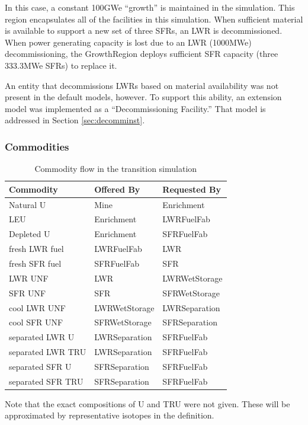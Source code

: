 In this case, a constant 100GWe ``growth'' is maintained in the simulation. 
This region encapsulates all of the facilities in this simulation. 
When sufficient material is available to support a new set of three SFRs, an 
LWR is decommissioned. When power generating capacity is lost due to an LWR 
(1000MWe) decommissioning, the GrowthRegion deploys sufficient SFR capacity 
(three 333.3MWe SFRs) to replace it. 

An entity that decommissions LWRs based on material availability was not 
present in the default models, however. To support this ability, an extension 
model was implemented as a ``Decommissioning Facility.'' That model is 
addressed in Section \ref{sec:decomminst}.

\subsubsection{Commodities}

\begin{table}[htbp!]
\centering
\begin{tabular}{|l|l|l|}
\hline
Commodity  &     Offered By  &    Requested By \\
\hline
Natural  U & Mine & Enrichment \\ 
LEU & Enrichment & LWRFuelFab \\ 
Depleted U & Enrichment & SFRFuelFab \\ 
fresh LWR fuel & LWRFuelFab & LWR \\ 
fresh SFR fuel & SFRFuelFab & SFR \\ 
LWR UNF & LWR & LWRWetStorage \\ 
SFR UNF & SFR & SFRWetStorage \\ 
cool LWR UNF & LWRWetStorage & LWRSeparation \\ 
cool SFR UNF & SFRWetStorage & SFRSeparation \\ 
separated LWR U & LWRSeparation & SFRFuelFab \\ 
separated LWR TRU & LWRSeparation & SFRFuelFab \\ 
separated SFR U & SFRSeparation & SFRFuelFab \\ 
separated SFR TRU & SFRSeparation & SFRFuelFab \\ 
\hline
\end{tabular}
\caption{Commodity flow in the transition simulation}
\label{tab:commods}
\end{table}
Note that the exact compositions of U and TRU were not given. These will be
approximated by representative isotopes in the \Cyclus definition.

